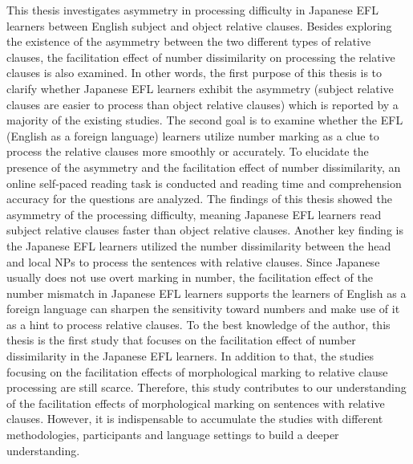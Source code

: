 \documentclass[
]{article}
\begin{document}
\noindent This thesis investigates asymmetry in processing difficulty in
Japanese EFL learners between English subject and object relative
clauses. Besides exploring the existence of the asymmetry between the
two different types of relative clauses, the facilitation effect of
number dissimilarity on processing the relative clauses is also
examined. In other words, the first purpose of this thesis is to clarify
whether Japanese EFL learners exhibit the asymmetry (subject relative
clauses are easier to process than object relative clauses) which is
reported by a majority of the existing studies. The second goal is to
examine whether the EFL (English as a foreign language) learners utilize
number marking as a clue to process the relative clauses more smoothly
or accurately. To elucidate the presence of the asymmetry and the
facilitation effect of number dissimilarity, an online self-paced
reading task is conducted and reading time and comprehension accuracy
for the questions are analyzed. The findings of this thesis showed the
asymmetry of the processing difficulty, meaning Japanese EFL learners
read subject relative clauses faster than object relative clauses.
Another key finding is the Japanese EFL learners utilized the number
dissimilarity between the head and local NPs to process the sentences
with relative clauses. Since Japanese usually does not use overt marking
in number, the facilitation effect of the number mismatch in Japanese
EFL learners supports the learners of English as a foreign language can
sharpen the sensitivity toward numbers and make use of it as a hint to
process relative clauses. To the best knowledge of the author, this
thesis is the first study that focuses on the facilitation effect of
number dissimilarity in the Japanese EFL learners. In addition to that,
the studies focusing on the facilitation effects of morphological
marking to relative clause processing are still scarce. Therefore, this
study contributes to our understanding of the facilitation effects of
morphological marking on sentences with relative clauses. However, it is
indispensable to accumulate the studies with different methodologies,
participants and language settings to build a deeper understanding.

\clearpage
{}
\setcounter{page}{4}

\pagestyle{plain}
\tableofcontents

\clearpage
\pagestyle{plain}
\listoffigures

\clearpage
\pagestyle{plain}
\listoftables
\end{document}
